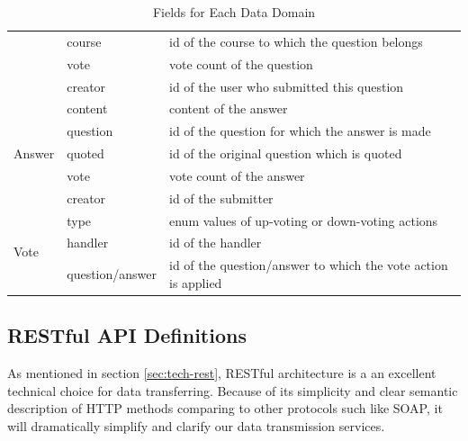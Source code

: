 \begin{table}[]
\begin{tabularx}{\textwidth}{@{}llX@{}}
                          & course          & id of the course to which the question belongs                                             \\
                          & vote            & vote count of the question                                                                     \\
                          & creator         & id of the user who submitted this question                                                     \\ \midrule
\multirow{5}{*}{Answer}   & content         & content of the answer                                                                          \\
                          & question        & id of the question for which the answer is made                                                \\
                          & quoted          & id of the original question which is quoted                                                    \\
                          & vote            & vote count of the answer                                                                       \\
                          & creator         & id of the submitter                                                                            \\ \midrule
\multirow{3}{*}{Vote}     & type            & enum values of up-voting or down-voting actions                                                \\
                          & handler         & id of the handler                                                                               \\
                          & question/answer & id of the question/answer to which the vote action is applied                                  \\ \midrule
\end{tabularx}
\caption{Fields for Each Data Domain}
\label{table:data-field-table}
\end{table}


\subsection{RESTful API Definitions}

As mentioned in section \ref{sec:tech-rest}, RESTful architecture is a an excellent technical choice for data transferring. Because of its simplicity and clear semantic description of HTTP methods comparing to other protocols such like SOAP, it will dramatically simplify and clarify our data transmission services\cite{fielding2002principled}. 

